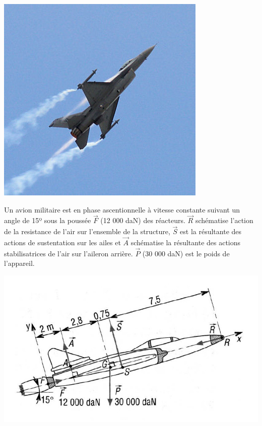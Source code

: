 \begin{minipage}{0.4\linewidth}
 \centering\includegraphics[width=0.7\linewidth]{img/avion_chasse.jpg}
\end{minipage}
\hfill
\begin{minipage}{0.56\linewidth}
Un avion militaire est en phase ascentionnelle à vitesse constante suivant un angle de 15º sous la poussée $\overrightarrow{F}$ (12 000 daN) des réacteurs. $\overrightarrow{R}$ schématise l'action de la resistance de l'air sur l'ensemble de la structure, $\overrightarrow{S}$ est la résultante des actions de sustentation sur les ailes et $\overrightarrow{A}$ schématise la résultante des actions stabilisatrices de l'air sur l'aileron arrière. $\overrightarrow{P}$ (30 000 daN) est le poids de l'appareil.
\end{minipage}

\begin{center}
 \includegraphics[width=0.9\linewidth]{img/avion_schem.jpg}
\end{center}

